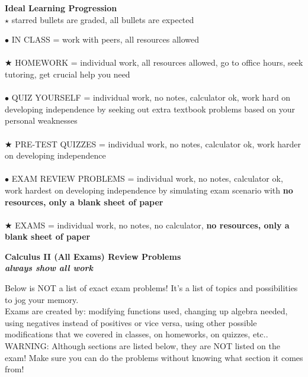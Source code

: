\documentclass{exam}
\begin{document}
\begin{center}
{\bf Ideal Learning Progression}\\
$\star$ starred bullets are graded, all bullets are expected
\end{center}
$\bullet$  IN CLASS = work with peers, all resources allowed\\
 \ \\
 $\bigstar$ HOMEWORK  = individual work, all resources allowed, go to office hours, seek tutoring, get crucial help you need \\
 \ \\
$\bullet$ QUIZ YOURSELF = individual work, no notes, calculator ok, work hard on developing independence 
by seeking out extra textbook problems based on your personal weaknesses\\
\ \\
 $\bigstar$ PRE-TEST QUIZZES   = individual work, no notes, calculator ok, work harder on developing independence  \\
 \ \\
$\bullet$ EXAM REVIEW PROBLEMS = individual work, no notes, calculator ok, work hardest on developing independence
by simulating exam scenario with {\bf no resources, only a blank sheet of paper}\\
\ \\
 $\bigstar$ EXAMS  = individual work, no notes, no calculator, {\bf no resources, only a blank sheet of paper}\\




\begin{center}{\bf Calculus II (All Exams) Review Problems\\ {\it always show all work}
}\\ %
\end{center}

\noindent Below is NOT a list of exact exam problems!  It's a list of topics and possibilities to jog your memory.\\ Exams are created by:  modifying functions used, changing up algebra needed, using negatives instead of positives or vice versa, using other possible modifications that we covered in classes, on homeworks, on quizzes, etc..\\

\noindent WARNING:  Although sections are listed below, they are NOT listed on the exam!  Make sure you can do the problems without knowing what section it comes from!\\
\end{document}
